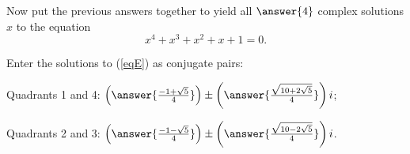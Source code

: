 \documentclass[space,nooutcomes]{ximera}
\begin{document}
\begin{problem}
Now put the previous answers together to yield all $\answer{4}$ complex solutions $x$ to the equation
\begin{equation} \label{eqE}
x^4+x^3+x^2+x+1=0.
\end{equation}
\begin{problem}
Enter the solutions to (\ref{eqE}) as conjugate pairs: 

Quadrants 1 and 4: $\left(\answer{\frac{-1+\sqrt{5}}{4}}\right) 
     \pm \left(\answer{\frac{\sqrt{10+2\sqrt{5}}}{4}}\right)i$;

Quadrants 2 and 3: $\left(\answer{\frac{-1-\sqrt{5}}{4}}\right)
     \pm \left(\answer{\frac{\sqrt{10-2\sqrt{5}}}{4}}\right)i$.

\end{problem}
\end{problem}
\end{document}
